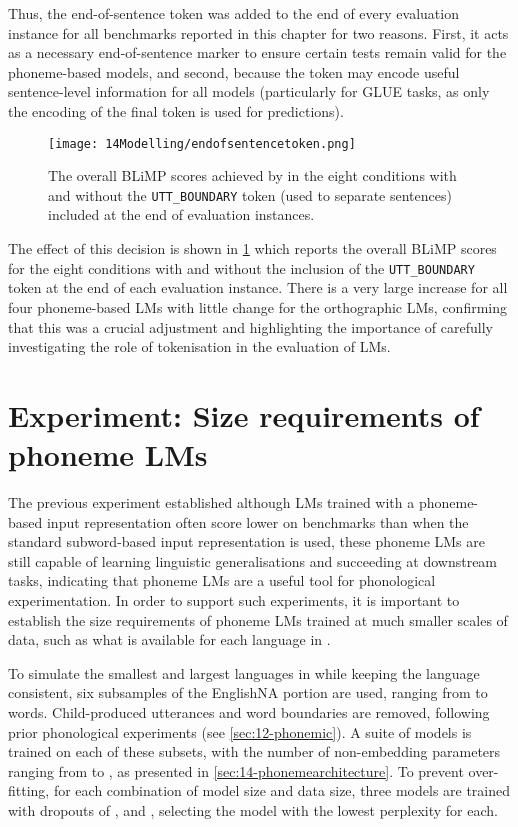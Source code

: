 Thus, the end-of-sentence token was added to the end of every evaluation instance for all benchmarks reported in this chapter for two reasons. First, it acts as a necessary end-of-sentence marker to ensure certain tests remain valid for the phoneme-based models, and second, because the token may encode useful sentence-level information for all models (particularly for GLUE tasks, as only the encoding of the final token is used for predictions).

\begin{figure}[t]
    \centering
    \texttt{[image: 14Modelling/endofsentencetoken.png]}
    \caption{The overall BLiMP scores achieved by \gpt in the eight conditions with and without the \texttt{UTT\_BOUNDARY} token (used to separate sentences) included at the end of evaluation instances.}
    \label{fig:14-endofsentencetoken}
\end{figure}

The effect of this decision is shown in \cref{fig:14-endofsentencetoken} which reports the overall BLiMP scores for the eight conditions with and without the inclusion of the \texttt{UTT\_BOUNDARY} token at the end of each evaluation instance. There is a very large increase for all four phoneme-based LMs with little change for the orthographic LMs, confirming that this was a crucial adjustment and highlighting the importance of carefully investigating the role of tokenisation in the evaluation of LMs.

\section{Experiment: Size requirements of phoneme LMs}\label{sec:14-sizerequirements}

The previous experiment established although LMs trained with a phoneme-based input representation often score lower on benchmarks than when the standard subword-based input representation is used, these phoneme LMs are still capable of learning linguistic generalisations and succeeding at downstream tasks, indicating that phoneme LMs are a useful tool for phonological experimentation. In order to support such experiments, it is important to establish the size requirements of phoneme LMs trained at much smaller scales of data, such as what is available for each language in \ipachildes.

To simulate the smallest and largest languages in \ipachildes while keeping the language consistent, six subsamples of the EnglishNA portion are used, ranging from  to  words. Child-produced utterances and word boundaries are removed, following prior phonological experiments (see \cref{sec:12-phonemic}). A suite of \gpt models is trained on each of these subsets, with the number of non-embedding parameters ranging from  to , as presented in \cref{sec:14-phonemearchitecture}. To prevent over-fitting, for each combination of model size and data size, three models are trained with dropouts of ,  and , selecting the model with the lowest perplexity for each.




